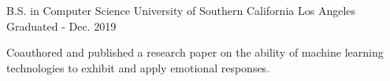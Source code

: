 

\begin{cventries}

  \cventry
    {B.S. in Computer Science} %
    {University of Southern California} %
    {Los Angeles} %
    {Graduated - Dec. 2019} %
    {
      \begin{cvitems} %
        \item {Coauthored and published a research paper on the ability of machine learning technologies to exhibit and apply emotional responses.}
      \end{cvitems}
    }

\end{cventries}
